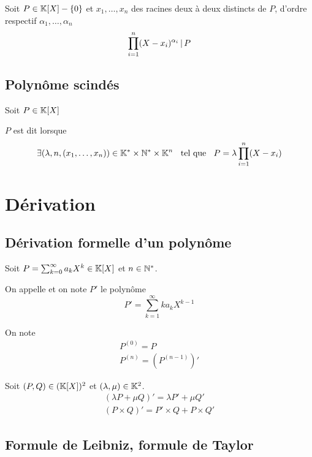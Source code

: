 \begin{prp}
  Soit $P \in \mathbb{K}[X] - \{0\}$ et $x_1, \ldots, x_n$ des racines
  deux à deux distincts de $P$, d'ordre respectif $\alpha_1, \ldots, \alpha_n$
  \[
    \prod^n_{i = 1} (X - x_i)^{\alpha_i} \operatorname{|} P
  \]
\end{prp}

\subsection{Polynôme scindés}

\begin{dfn}
  Soit $P \in \mathbb{K}[X]$

  $P$ est dit  lorsque
  \[
    \exists (\lambda, n, (x_1, \ldots, x_n)) \in \mathbb{K}^* \times \mathbb{N}^* \times \mathbb{K}^n
    \;\;\text{ tel que }\;\; P = \lambda \prod^n_{i = 1} (X - x_i)
  \]
\end{dfn}

\section{Dérivation}

\subsection{Dérivation formelle d'un polynôme}

\begin{dfn}
  Soit $P = \sum^\infty_{k = 0} a_k X^k \in \mathbb{K}[X]$ et $n \in \mathbb{N}^*$.

  On appelle  et on note $P'$ le
  polynôme
  \[
    P' = \sum^\infty_{k = 1} k a_k X^{k - 1}
  \]

  On note
  \begin{gather*}
    P^{(0)} = P \\
    P^{(n)} = (P^{(n - 1)})'
  \end{gather*}
\end{dfn}

\begin{prp}
  Soit $(P, Q) \in (\mathbb{K}[X])^2$ et $(\lambda, \mu) \in \mathbb{K}^2$.
  \begin{gather*}
    (\lambda P + \mu Q)' = \lambda P' + \mu Q' \\
    (P \times Q)' = P' \times Q + P \times Q'
  \end{gather*}
\end{prp}

\subsection{Formule de Leibniz, formule de Taylor}


